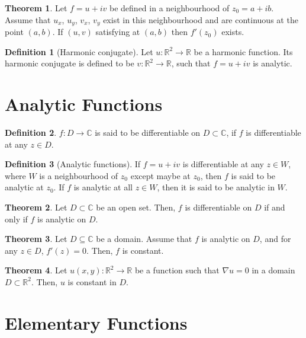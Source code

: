 \documentclass[titlepage, fleqn, a4paper, 12pt, twoside]{article}
\theoremstyle{definition}
\newtheorem{definition}{Definition}
\theoremstyle{theorem}
\newtheorem{theorem}{Theorem}
\begin{document}
\begin{theorem}
	Let $f = u + i v$ be defined in a neighbourhood of $z_0 = a + i b$.
	Assume that $u_x$, $u_y$, $v_x$, $v_y$ exist in this neighbourhood and are continuous at the point $(a,b)$.
	If $(u,v)$ satisfying  at $(a,b)$ then $f'(z_0)$ exists.
\end{theorem}

\begin{definition}[Harmonic conjugate]
	Let $u : \mathbb{R}^2 \to \mathbb{R}$ be a harmonic function.
	Its harmonic conjugate is defined to be $v : \mathbb{R}^2 \to \mathbb{R}$, such that $f = u + i v$ is analytic.
\end{definition}

\section{Analytic Functions}

\begin{definition}
	$f : D \to \mathbb{C}$ is said to be differentiable on $D \subset \mathbb{C}$, if $f$ is differentiable at any $z \in D$.
\end{definition}

\begin{definition}[Analytic functions]
	If $f = u + i v$ is differentiable at any $z \in W$, where $W$ is a neighbourhood of $z_0$ except maybe at $z_0$, then $f$ is said to be analytic at $z_0$.
	If $f$ is analytic at all $z \in W$, then it is said to be analytic in $W$.
\end{definition}

\begin{theorem}
	Let $D \subset \mathbb{C}$ be an open set.
	Then, $f$ is differentiable on $D$ if and only if $f$ is analytic on $D$.
\end{theorem}

\begin{theorem}
	Let $D \subseteq \mathbb{C}$ be a domain.
	Assume that $f$ is analytic on $D$, and for any $z \in D$, $f'(z) = 0$.
	Then, $f$ is constant.
\end{theorem}

\begin{theorem}
	Let $u(x,y) : \mathbb{R}^2 \to \mathbb{R}$ be a function such that $\nabla u = 0$ in a domain $D \subset \mathbb{R}^2$.
	Then, $u$ is constant in $D$.
\end{theorem}

\section{Elementary Functions}
\end{document}
